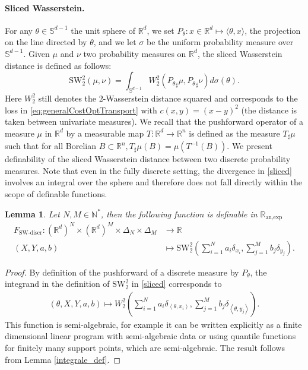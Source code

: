 \documentclass[11pt]{article}
\newcommand{\R}{\mathbb R}
\newcommand{\1}{\mathbbm{1}}
\newtheorem{lem}{Lemma}[section]
\numberwithin{equation}{section}
\begin{document}
\paragraph{Sliced Wasserstein.} For any $\theta\in\mathbb{S}^{d-1}$ the unit sphere of $\R^d$, we set $P_{\theta}:x\in\mathbb{R}^{d}\mapsto  \langle \theta,x \rangle$, the projection on the line directed by $\theta$, and we let $\sigma$ be the uniform probability measure over $\mathbb{S}^{d-1}$.
Given $\mu$ and $\nu$ two probability measures on $\mathbb{R}^{d}$, the sliced Wasserstein distance is defined as follows:  
\begin{equation}\label{sliced}
    \text{SW}_{2}^{2}(\mu,\nu)=\int_{\mathbb{S}^{d-1}}W_{2}^{2}({P_{\theta}}_{\sharp} \mu,{P_{\theta}}_{\sharp} \nu)d\sigma(\theta).
\end{equation}
Here $W_2^2$ still denotes the $2$-Wasserstein distance squared and corresponds to the loss in \eqref{eq:generalCostOptTransport} with $c(x,y) = (x-y)^2$ (the distance is taken between univariate measures).
We recall that the pushforward operator of a measure $\mu$ in $\R^d$ by a measurable map $T:\R^d\to\R^n$ is defined as the measure $T_{\sharp}\mu$ such that for all Borelian $B\subset\R^n, T_{\sharp} \mu(B)=\mu\left(T^{-1}(B)\right)$. We present definability of the sliced Wasserstein distance between two discrete probability measures. Note that even in the fully discrete setting, the divergence in \eqref{sliced} involves an integral over the sphere and therefore does not fall directly within the scope of definable functions.
\begin{lem}\label{lem_SW_discrete}
    Let $N,M\in \mathbb{N}^{*}$, then the following function is definable in $\mathbb{R}_{\text{an,exp}}$ 
\begin{align*}
	F_{\text{SW-discr}} :  (\mathbb{R}^{d})^{N}\times (\mathbb{R}^{d})^{M} \times \Delta_{N}\times \Delta_{M}  &\to \R \\
	(X,Y,a,b) &\mapsto \text{SW}_{2}^{2}\left(\sum_{i=1}^{N}a_{i}\delta_{x_{i}},\sum_{j=1}^{M}b_{j}\delta_{y_{j}}\right).
\end{align*}
\end{lem}
\begin{proof}
    By definition of the pushforward of a discrete measure by $P_\theta$, the integrand in the definition of $\text{SW}_{2}^{2}$ in \eqref{sliced} corresponds to
	\begin{align*}
		(\theta, X,Y,a,b) \mapsto W_2^2 \left(\sum_{i=1}^{N}a_{i}\delta_{\left\langle \theta,x_{i}\right\rangle},\sum_{j=1}^{M}b_{j}\delta_{\left\langle \theta, y_{j}\right\rangle}\right).
	\end{align*}
	This function is semi-algebraic, for example it can be written explicitly as a finite dimensional linear program with semi-algebraic data or using quantile functions for finitely many support points, which are semi-algebraic. The result follows from Lemma \ref{integrale_def}.
\end{proof}
\end{document}
